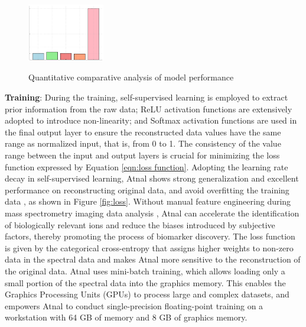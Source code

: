 \documentclass[journal=jacsat,manuscript=article]{achemso}
\begin{document}
\begin{figure}[htbp]
\begin{minipage}{0.51\textwidth}
{    \label{fig:Loss in models}
    }
  \end{minipage}
  \subfloat
  {
    \includegraphics[width=0.3\textwidth]{./pic/coloractal/hist.pdf}
    \label{fig:hist}
  }
\caption{Quantitative comparative analysis of model performance}
\label{fig:model performance}
\end{figure}
\vspace{-10pt}

\textbf{Training}: During the training, self-supervised learning is employed to extract prior 
information from the raw data; 
ReLU activation functions are extensively 
adopted to introduce non-linearity; and Softmax 
activation functions are used  in the final output layer to 
ensure the reconstructed data values have the same range as 
normalized input, that is, from 0 to 1. 
The consistency of the value range between the input and output layers is 
crucial for minimizing the loss function expressed 
by Equation \ref{eqn:loss function}. 
Adopting the learning rate decay in self-supervised learning,
Atnal shows strong generalization and excellent performance on 
reconstructing original data, and avoid overfitting
the training data , as shown in Figure \ref{fig:loss}. 
Without manual feature 
engineering during mass spectrometry 
imaging data analysis , Atnal can accelerate the identification of 
biologically relevant ions and reduce the biases introduced 
by subjective factors, thereby promoting the process of 
biomarker discovery. 
The loss function is given by 
the categorical cross-entropy that assigns higher weights 
to non-zero data in the spectral data 
and makes Atnal more sensitive to the reconstruction of the original data. 
Atnal uses mini-batch training, which allows 
loading only a small portion of the spectral 
data into the graphics memory. This enables the Graphics Processing Units (GPUs) to process
large and complex datasets, and empowers Atnal to 
conduct single-precision floating-point training on a workstation 
with 64 GB of memory and 8 GB of graphics memory. 
\end{document}
